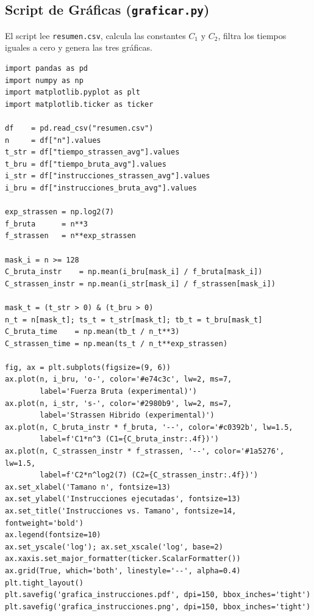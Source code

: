 \documentclass[12pt,a4paper]{article}
\begin{document}
\subsection{Script de Gr\'aficas (\texttt{graficar.py})}

El script lee \texttt{resumen.csv}, calcula las constantes $C_1$ y $C_2$,
filtra los tiempos iguales a cero y genera las tres gr\'aficas.

\begin{lstlisting}[style=pystyle,
    caption={C\'odigo completo de \texttt{graficar.py}},
    label={lst:graficar}]
import pandas as pd
import numpy as np
import matplotlib.pyplot as plt
import matplotlib.ticker as ticker

df    = pd.read_csv("resumen.csv")
n     = df["n"].values
t_str = df["tiempo_strassen_avg"].values
t_bru = df["tiempo_bruta_avg"].values
i_str = df["instrucciones_strassen_avg"].values
i_bru = df["instrucciones_bruta_avg"].values

exp_strassen = np.log2(7)
f_bruta      = n**3
f_strassen   = n**exp_strassen

mask_i = n >= 128
C_bruta_instr    = np.mean(i_bru[mask_i] / f_bruta[mask_i])
C_strassen_instr = np.mean(i_str[mask_i] / f_strassen[mask_i])

mask_t = (t_str > 0) & (t_bru > 0)
n_t = n[mask_t]; ts_t = t_str[mask_t]; tb_t = t_bru[mask_t]
C_bruta_time    = np.mean(tb_t / n_t**3)
C_strassen_time = np.mean(ts_t / n_t**exp_strassen)

fig, ax = plt.subplots(figsize=(9, 6))
ax.plot(n, i_bru, 'o-', color='#e74c3c', lw=2, ms=7,
        label='Fuerza Bruta (experimental)')
ax.plot(n, i_str, 's-', color='#2980b9', lw=2, ms=7,
        label='Strassen Hibrido (experimental)')
ax.plot(n, C_bruta_instr * f_bruta, '--', color='#c0392b', lw=1.5,
        label=f'C1*n^3 (C1={C_bruta_instr:.4f})')
ax.plot(n, C_strassen_instr * f_strassen, '--', color='#1a5276', lw=1.5,
        label=f'C2*n^log2(7) (C2={C_strassen_instr:.4f})')
ax.set_xlabel('Tamano n', fontsize=13)
ax.set_ylabel('Instrucciones ejecutadas', fontsize=13)
ax.set_title('Instrucciones vs. Tamano', fontsize=14, fontweight='bold')
ax.legend(fontsize=10)
ax.set_yscale('log'); ax.set_xscale('log', base=2)
ax.xaxis.set_major_formatter(ticker.ScalarFormatter())
ax.grid(True, which='both', linestyle='--', alpha=0.4)
plt.tight_layout()
plt.savefig('grafica_instrucciones.pdf', dpi=150, bbox_inches='tight')
plt.savefig('grafica_instrucciones.png', dpi=150, bbox_inches='tight')


\end{lstlisting}
\end{document}
